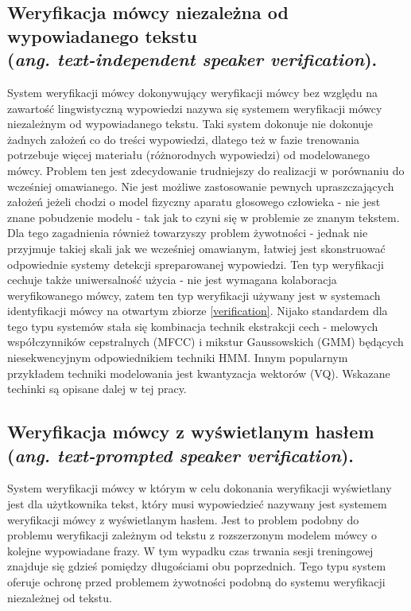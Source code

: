 \subsection{Weryfikacja mówcy niezależna od wypowiadanego tekstu \\ (\textit{ang. text-independent speaker verification}).}
System weryfikacji mówcy dokonywujący weryfikacji mówcy bez względu na zawartość lingwistyczną wypowiedzi nazywa się systemem weryfikacji mówcy niezależnym od wypowiadanego tekstu. Taki system dokonuje nie dokonuje żadnych założeń co do treści wypowiedzi, dlatego też w fazie trenowania potrzebuje więcej materiału (różnorodnych wypowiedzi) od modelowanego mówcy. Problem ten jest zdecydowanie trudniejszy do realizacji w porównaniu do wcześniej omawianego. Nie jest możliwe zastosowanie pewnych upraszczających założeń jeżeli chodzi o model fizyczny aparatu głosowego człowieka - nie jest znane pobudzenie modelu - tak jak to czyni się w problemie ze znanym tekstem. Dla tego zagadnienia również towarzyszy problem żywotności - jednak nie przyjmuje takiej skali jak we wcześniej omawianym, łatwiej jest skonstruować odpowiednie systemy detekcji spreparowanej wypowiedzi. Ten typ weryfikacji cechuje także uniwersalność użycia - nie jest wymagana kolaboracja weryfikowanego mówcy, zatem ten typ weryfikacji używany jest w systemach identyfikacji mówcy na otwartym zbiorze \ref{verification}. Nijako standardem dla tego typu systemów stała się kombinacja technik ekstrakcji cech - melowych współczynników cepstralnych (MFCC) i mikstur Gaussowskich (GMM) będących niesekwencyjnym odpowiednikiem techniki HMM. Innym popularnym przykładem techniki modelowania jest kwantyzacja wektorów (VQ). Wskazane techinki są opisane dalej w tej pracy.

\subsection{Weryfikacja mówcy z wyświetlanym hasłem \\ (\textit{ang. text-prompted speaker verification}).}
\label{prompted}
System weryfikacji mówcy w którym w celu dokonania weryfikacji wyświetlany jest dla użytkownika tekst, który musi wypowiedzieć nazywany jest systemem weryfikacji mówcy z wyświetlanym hasłem. Jest to problem podobny do problemu weryfikacji zależnym od tekstu z rozszerzonym modelem mówcy o kolejne wypowiadane frazy. W tym wypadku czas trwania sesji treningowej znajduje się gdzieś pomiędzy długościami obu poprzednich. Tego typu system oferuje ochronę przed problemem żywotności podobną do systemu weryfikacji niezależnej od tekstu. 

